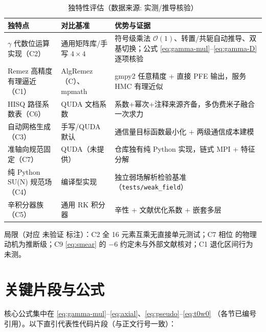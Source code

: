 \documentclass[UTF8]{ctexart}
\begin{document}
\begin{table}[htbp]\centering
\begin{tabularx}{\textwidth}{lXX}
\toprule
\textcolor{algo}{独特点} & 对比基准 & 优势与证据 \\
\midrule
$\gamma$ 代数位运算实现（C2） & 通用矩阵库/手写 $4\times4$ & 符号级乘法 $\mathcal{O}(1)$、转置/共轭自动推导、双基切换；公式 \eqref{eq:gamma-mul}--\eqref{eq:gamma-D} 逐项核验 \\
Remez 高精度有理逼近（C1） & AlgRemez（C）、mpmath & gmpy2 任意精度 + 直接 PFE 输出，服务 HMC 有理近似 \\
HISQ 路径系数表（C6） & QUDA 文档系数 & 系数+幂次+注释来源齐备，多伪费米子融合一次求力 \\
自动网格生成（C3） & 手写/QUDA 默认 & 通信量目标函数最小化 + 两级通信成本建模 \\
准轴向规范固定（C7） & QUDA（未提供） & 仓库独有纯 Python 实现，链式 MPI + 特征分解 \\
纯 Python SU(N) 规范场（C4） & 编译型实现 & 独立弱场解析检验基准（\texttt{tests/weak\_field}） \\
辛积分器族（C5） & 通用 RK 积分器 & 辛性 + 文献优化系数 + 嵌套多层 \\
\bottomrule
\end{tabularx}
\caption{独特性评估（数据来源: 实测/推导核验）}
\end{table}

局限（对应 \textcolor{warn}{未验证} 标注）：C2 全 16 元素互乘无直接单元测试；C7 相位
的物理动机为推断级；C9 \eqref{eq:smear} 的 $-6$ 约定未与外部文献核对；C1 退化区间行为
未测。

\section{关键片段与公式}

核心公式集中在 \eqref{eq:gamma-mul}--\eqref{eq:axial}、\eqref{eq:pseudo}--\eqref{eq:t0w0}
（各节已编号引用）。以下直引代表性代码片段（与正文行号一致）：






\end{document}
